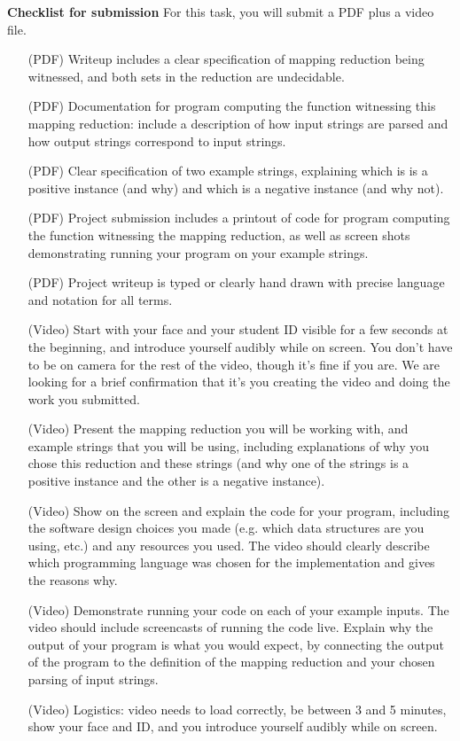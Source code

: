 \newpage
{\bf Checklist for submission} For this task, you will submit a PDF plus a video file.

\vspace{-10pt}

\begin{itemize}
   \item[(PDF)] Writeup includes a clear specification of mapping reduction being witnessed, and both sets in the reduction are undecidable.
   \item[(PDF)] Documentation for program computing the function witnessing this mapping reduction:
   include a description of how input strings are parsed and how output strings correspond to input strings.
   \item[(PDF)] Clear specification of two example strings, explaining which is is a positive instance (and why) and which is a negative instance (and why not).
   \item[(PDF)] Project submission includes a printout of code for program computing the function witnessing the mapping reduction, as well as screen shots demonstrating running your program on your 
   example strings.
   \item[(PDF)] Project writeup is typed or clearly hand drawn with precise language and notation for all terms.
   \item[(Video)] Start with your face and your student ID visible for a few seconds at the beginning, and introduce yourself audibly while on screen. You don't have to be on camera for the  rest of the video, though it's fine if you are. We are looking for a brief confirmation that  it's you creating the video and doing the work you submitted.
\item[(Video)] Present the mapping reduction you will be working with, and 
example strings that you will be using, including explanations of why you chose this reduction and these strings (and why one of the strings is a positive instance and the other is a negative instance).
\item[(Video)] Show on the screen and explain the code for your program, including the software design choices you made
(e.g. which data structures are you using, etc.) and any resources you used. The video 
should clearly describe which programming language was chosen 
for the implementation and gives the reasons why.
\item[(Video)] Demonstrate running your code on each of your example inputs. The video should include screencasts of 
running the code live.
Explain why the output of your program is what you would expect, by connecting the output of the 
program to the definition of the mapping reduction and your chosen parsing of input strings.
\item[(Video)] Logistics: video needs to load correctly, be between 3 and 5 minutes, 
show your face and ID, and you introduce yourself 
audibly while on screen.
\end{itemize}

